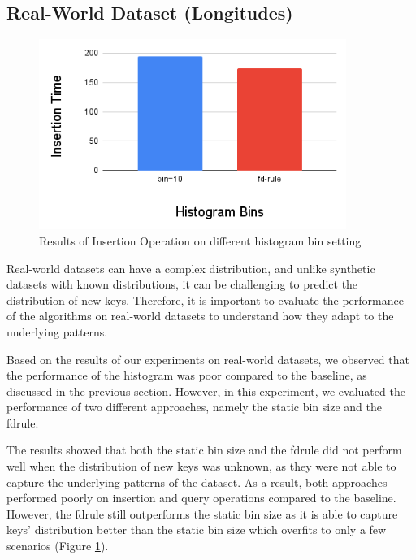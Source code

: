 \subsection{Real-World Dataset (Longitudes)} 
\begin{figure}[H]
    \centering
    \includegraphics[width=100mm,scale=1]{Figures/InsertionHistBinLogi.png}
    \caption{
     Results of Insertion Operation on different histogram bin setting
    }
    \label{fig:InsertionResultLogi}
\end{figure}
Real-world datasets can have a complex distribution, and unlike synthetic datasets with known distributions, it can be challenging to predict the distribution of new keys. Therefore, it is important to evaluate the performance of the \learnindex algorithms on real-world datasets to understand how they adapt to the underlying patterns.

Based on the results of our experiments on real-world datasets, we observed that the performance of the histogram \learnindex was poor compared to the baseline, as discussed in the previous section. However, in this experiment, we evaluated the performance of two different approaches, namely the static bin size and the \acrshort{fdrule}.

The results showed that both the static bin size and the \acrshort{fdrule} did not perform well when the distribution of new keys was unknown, as they were not able to capture the underlying patterns of the dataset. As a result, both approaches performed poorly on insertion and query operations compared to the baseline. However, the \acrshort{fdrule} still outperforms the static bin size as it is able to capture keys' distribution better than the static bin size which overfits to only a few scenarios (Figure \ref{fig:InsertionResultLogi}).

